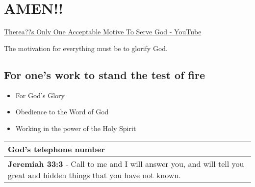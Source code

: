 \documentclass[11pt]{article}
\begin{document}
\section{AMEN!!}
\label{sec:org978e8e6}
\href{https://www.youtube.com/watch?v=TEa3UWFgwnk}{Therea??s Only One Acceptable Motive To Serve God - YouTube}

The motivation for everything must be to glorify God.

\subsection{For one's work to stand the test of fire}
\label{sec:orgdcc263d}
\begin{itemize}
\item For God's Glory
\item Obedience to the Word of God
\item Working in the power of the Holy Spirit
\end{itemize}

\begin{center}
\begin{tabular}{l}
God's telephone number\\[0pt]
\hline
\textbf{Jeremiah 33:3} - Call to me and I will answer you, and will tell you great and hidden things that you have not known.\\[0pt]
\end{tabular}
\end{center}
\end{document}

